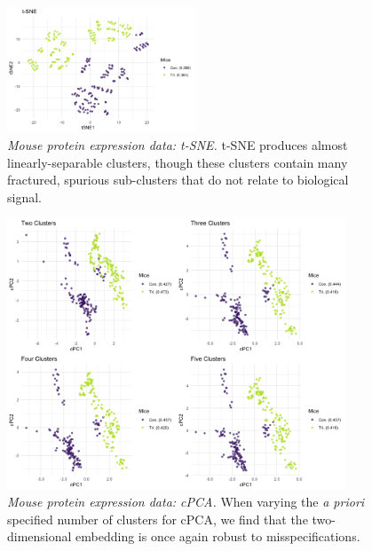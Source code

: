 \documentclass{article}
\begin{document}
\begin{figure}[!htbp]
    \centering
    \includegraphics[width=0.5\textwidth]{figures/mice_tsne}
    \caption{
    \textit{Mouse protein expression data: t-SNE.}
    t-SNE produces almost linearly-separable clusters, though these clusters contain many fractured, spurious sub-clusters that do not relate to biological signal.
    }
    \label{fig:mice_tsne}
\end{figure}

\begin{figure}[!htbp]
    \centering
    \includegraphics[width=0.9\textwidth]{figures/mice_cpca_centers}
    \caption{
    \textit{Mouse protein expression data: cPCA.}
    When varying the \textit{a priori} specified number of clusters for cPCA, we find that the two-dimensional embedding is once again robust to misspecifications.
    }
    \label{fig:mice_cpca_centers}
\end{figure}
\end{document}
